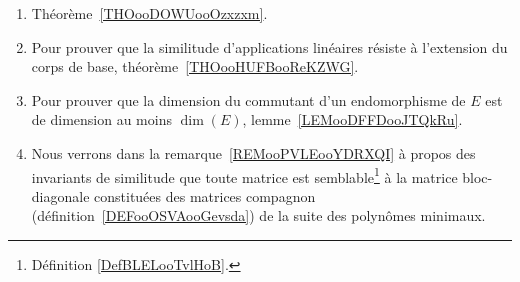 
	\label{THEMEooInvariantsSimilitude}
\begin{enumerate}
	\item
	      Théorème~\ref{THOooDOWUooOzxzxm}.
	\item
	      Pour prouver que la similitude d'applications linéaires résiste à l'extension du corps de base, théorème~\ref{THOooHUFBooReKZWG}.
	\item
	      Pour prouver que la dimension du commutant d'un endomorphisme de \( E\) est de dimension au moins \( \dim(E)\), lemme~\ref{LEMooDFFDooJTQkRu}.
	\item
        	Nous verrons dans la remarque~\ref{REMooPVLEooYDRXQI} à propos des invariants de similitude que toute matrice est semblable\footnote{Définition \ref{DefBLELooTvlHoB}.} à la matrice bloc-diagonale constituées des matrices compagnon (définition~\ref{DEFooOSVAooGevsda}) de la suite des polynômes minimaux.
\end{enumerate}
